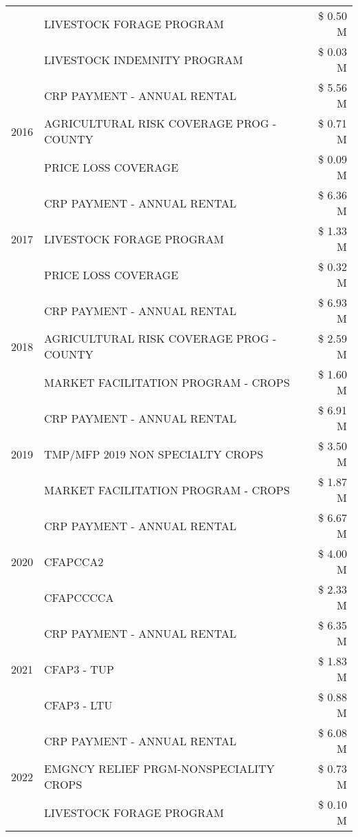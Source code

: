 \begin{tabular}{llr}
 & LIVESTOCK FORAGE PROGRAM & \$ 0.50 M \\
 & LIVESTOCK INDEMNITY PROGRAM & \$ 0.03 M \\
\cline{1-3}
\multirow[t]{3}{*}{2016} & CRP PAYMENT - ANNUAL RENTAL & \$ 5.56 M \\
 & AGRICULTURAL RISK COVERAGE PROG - COUNTY & \$ 0.71 M \\
 & PRICE LOSS COVERAGE & \$ 0.09 M \\
\cline{1-3}
\multirow[t]{3}{*}{2017} & CRP PAYMENT - ANNUAL RENTAL & \$ 6.36 M \\
 & LIVESTOCK FORAGE PROGRAM & \$ 1.33 M \\
 & PRICE LOSS COVERAGE & \$ 0.32 M \\
\cline{1-3}
\multirow[t]{3}{*}{2018} & CRP PAYMENT - ANNUAL RENTAL & \$ 6.93 M \\
 & AGRICULTURAL RISK COVERAGE PROG - COUNTY & \$ 2.59 M \\
 & MARKET FACILITATION PROGRAM - CROPS & \$ 1.60 M \\
\cline{1-3}
\multirow[t]{3}{*}{2019} & CRP PAYMENT - ANNUAL RENTAL & \$ 6.91 M \\
 & TMP/MFP 2019 NON SPECIALTY CROPS & \$ 3.50 M \\
 & MARKET FACILITATION PROGRAM - CROPS & \$ 1.87 M \\
\cline{1-3}
\multirow[t]{3}{*}{2020} & CRP PAYMENT - ANNUAL RENTAL & \$ 6.67 M \\
 & CFAPCCA2 & \$ 4.00 M \\
 & CFAPCCCCA & \$ 2.33 M \\
\cline{1-3}
\multirow[t]{3}{*}{2021} & CRP PAYMENT - ANNUAL RENTAL & \$ 6.35 M \\
 & CFAP3 - TUP & \$ 1.83 M \\
 & CFAP3 - LTU & \$ 0.88 M \\
\cline{1-3}
\multirow[t]{3}{*}{2022} & CRP PAYMENT - ANNUAL RENTAL & \$ 6.08 M \\
 & EMGNCY RELIEF PRGM-NONSPECIALITY CROPS & \$ 0.73 M \\
 & LIVESTOCK FORAGE PROGRAM & \$ 0.10 M \\
\cline{1-3}
\bottomrule
\end{tabular}
